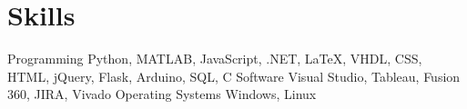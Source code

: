 \section{Skills}

\skills
  {Programming}
  {Python, MATLAB, JavaScript, .NET, LaTeX, VHDL, CSS, HTML, jQuery, Flask, Arduino, SQL, C}
  {Software}
  {Visual Studio, Tableau, Fusion 360, JIRA, Vivado}
  {Operating Systems}
  {Windows, Linux}


